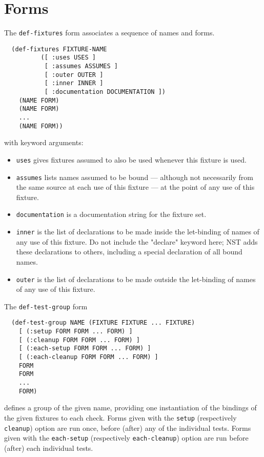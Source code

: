 \documentclass{article}
\begin{document}
\section*{Forms}
The \texttt{def-fixtures} form associates a sequence of names and
forms.
\begin{verbatim}
  (def-fixtures FIXTURE-NAME
          ([ :uses USES ]
           [ :assumes ASSUMES ]
           [ :outer OUTER ]
           [ :inner INNER ]
           [ :documentation DOCUMENTATION ])
    (NAME FORM)
    (NAME FORM)
    ...
    (NAME FORM))
\end{verbatim}
with keyword arguments:
\begin{itemize}

\item\texttt{uses} gives fixtures assumed to also be used whenever
  this fixture is used.

\item\texttt{assumes} lists names assumed to be bound --- although not
  necessarily from the same source at each use of this fixture --- at
  the point of any use of this fixture.

\item\texttt{documentation} is a documentation string for the fixture
  set.

\item\texttt{inner} is the list of declarations to be made inside the
  let-binding of names of any use of this fixture.  Do not include the
  "declare" keyword here; NST adds these declarations to others,
  including a special declaration of all bound names.

\item\texttt{outer} is the list of declarations to be made outside the
  let-binding of names of any use of this fixture.
\end{itemize}

The \texttt{def-test-group} form 
\begin{verbatim}
  (def-test-group NAME (FIXTURE FIXTURE ... FIXTURE)
    [ (:setup FORM FORM ... FORM) ]
    [ (:cleanup FORM FORM ... FORM) ]
    [ (:each-setup FORM FORM ... FORM) ]
    [ (:each-cleanup FORM FORM ... FORM) ]
    FORM
    FORM
    ...
    FORM)
\end{verbatim}
defines a group of the given name, providing one instantiation of the
bindings of the given fixtures to each check.  Forms given with the
\texttt{setup} (respectively \texttt{cleanup}) option are run once,
before (after) any of the individual tests.  Forms given with the
\texttt{each-setup} (respectively \texttt{each-cleanup}) option are
run before (after) each individual tests.
\end{document}
